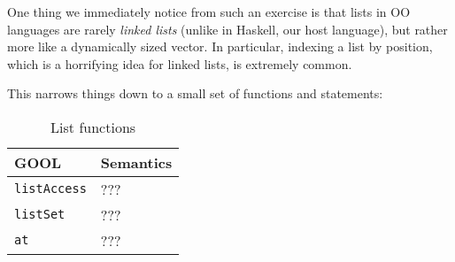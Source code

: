 \documentclass[sigplan,review,anonymous,prologue,dvipsnames]{acmart}
\begin{document}
One thing we immediately notice from such an exercise is that lists in
OO languages are rarely \emph{linked lists} (unlike in Haskell, our host
language), but rather more like a dynamically sized vector. In particular,
indexing a list by position, which is a horrifying idea for linked lists,
is extremely common.

This narrows things down to a small set of functions and statements:
\begin{table}[!h]
\caption{List functions}
\begin{tabular}{p{} p{}}
  \textbf{GOOL } & \textbf{Semantics} \\
  \midrule
  \verb|listAccess| & ??? \\
  \verb|listSet| & ??? \\
  \verb|at| & ??? \\

\end{tabular}
\label{tab:variables}
\end{table}
\end{document}

